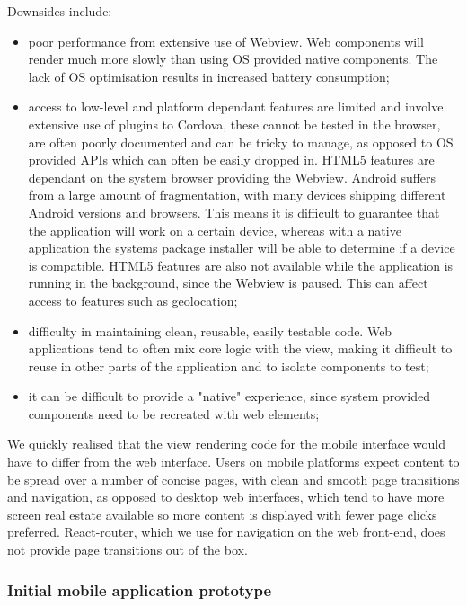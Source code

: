 Downsides include:

\begin{itemize}
	\item poor performance from extensive use of Webview. Web components will render much more slowly than using OS provided native components. The lack of OS optimisation results in increased battery consumption;
	\item access to low-level and platform dependant features are limited and involve extensive use of plugins to Cordova, these cannot be tested in the browser, are often poorly documented and can be tricky to manage, as opposed to OS provided APIs which can often be easily dropped in. HTML5 features are dependant on the system browser providing the Webview. Android suffers from a large amount of fragmentation, with many devices shipping different Android versions and browsers. This means it is difficult to guarantee that the application will work on a certain device, whereas with a native application the systems package installer will be able to determine if a device is compatible. HTML5 features are also not available while the application is running in the background, since the Webview is paused. This can affect access to features such as geolocation;
	\item difficulty in maintaining clean, reusable, easily testable code. Web applications tend to often mix core logic with the view, making it difficult to reuse in other parts of the application and to isolate components to test;
	\item it can be difficult to provide a "native" experience, since system provided components need to be recreated with web elements;
\end{itemize}



We quickly realised that the view rendering code for the mobile interface would have to differ from the web interface. Users on mobile platforms expect content to be spread over a number of concise pages, with clean and smooth page transitions and navigation, as opposed to desktop web interfaces, which tend to have more screen real estate available so more content is displayed with fewer page clicks preferred. React-router, which we use for navigation on the web front-end, does not provide page transitions out of the box.

\subsubsection{Initial mobile application prototype}

